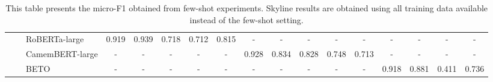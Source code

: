 \begin{table*}[ht]
{{\begin{tabular}{lll|ccccc|ccccc|cccc}
\midrule
 & & RoBERTa-large & 0.919 & 0.939 & 0.718 & 0.712 & 0.815 & - & - & - & - & - & - & - & - & - \\
 & & CamemBERT-large & - & - & - & - & - & 0.928 & 0.834 & 0.828 & 0.748 & 0.713 & - & - & - & - \\
 & & BETO & - & - & - & - & - & - & - & - & - & - & 0.918 & 0.881 & 0.411 & 0.736 \\
\bottomrule
\end{tabular}}}
\caption{This table presents the micro-F1 obtained from few-shot experiments. Skyline results are obtained using all training data available instead of the few-shot setting.}
\label{tab:results}
\end{table*}

